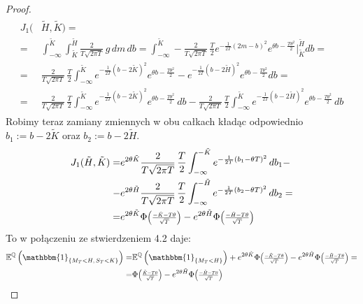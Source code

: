 \documentclass[11pt]{report}
\newcommand*{\Scale}[2][4]{\scalebox{#1}{$#2$}}%
\begin{document}
\begin{proof}
\begin{multline*}
\begin{split}
J_1(& \tilde{H}, \tilde{K}) = \\
= & \int_{-\infty}^{\tilde{K}} \int_{\tilde{K}}^{\tilde{H}} \frac{2}{T\sqrt{2\pi T}} \, g \, dm \, db =
\int_{-\infty}^{\tilde{K}} -\frac{2}{T\sqrt{2\pi T}} \, \frac{T}{2}e^{-\frac{1}{2T}(2m-b)^2}e^{\theta b-\frac{T\theta^2}{2}} |_{\tilde{K}}^{\tilde{H}} db = \\ = & \frac{2}{T\sqrt{2\pi T}} \, \frac{T}{2} \int_{-\infty}^{\tilde{K}} e^{-\frac{1}{2T}(b-2\tilde{K})^2}e^{\theta b-\frac{T\theta^2}{2}} -  e^{-\frac{1}{2T}(b-2\tilde{H})^2}e^{\theta b-\frac{T\theta^2}{2}}db = \\ = & \frac{2}{T\sqrt{2\pi T}} \, \frac{T}{2} \int_{-\infty}^{\tilde{K}} e^{-\frac{1}{2T}(b-2\tilde{K})^2}e^{\theta b-\frac{T\theta^2}{2}} \, db - \frac{2}{T\sqrt{2\pi T}} \, \frac{T}{2} \int_{-\infty}^{\tilde{K}} e^{-\frac{1}{2T}(b-2\tilde{H})^2}e^{\theta b-\frac{T\theta^2}{2}} \, db 
\end{split}
\end{multline*}
Robimy teraz zamiany zmiennych w obu całkach kładąc odpowiednio \\ $b_1:= b - 2\tilde{K}$ oraz $b_2:=b- 2\tilde{H}$.
\begin{multline*}
\begin{split}
J_1(\tilde{H}, \tilde{K}) = & e^{2 \theta \tilde{K}} \frac{2}{T\sqrt{2\pi T}} \, \frac{T}{2} \int_{-\infty}^{-\tilde{K}} e^{-\frac{1}{2T}(b_1-\theta T)^2} \, db_1 - \\ - & e^{2 \theta \tilde{H}} \frac{2}{T\sqrt{2\pi T}} \, \frac{T}{2} \int_{-\infty}^{-\tilde{H}} e^{-\frac{1}{2T}(b_2-\theta T)^2} \, db_2 = \\ = & e^{2 \theta \tilde{K}}  \Phi \Scale[0.8]{\left(\frac{-\tilde{K}-T\theta}{\sqrt{T}}\right)}  - e^{2 \theta \tilde{H}} \Phi \Scale[0.8]{\left(\frac{-\tilde{H}-T\theta}{\sqrt{T}}\right)}
\end{split}
\end{multline*}
To w połączeniu ze stwierdzeniem 4.2 daje:
\begin{multline*}
\begin{split}
\mathbb{E}^{\mathbb{Q}}\left(\mathbbm{1}_{ \{ M_T < H, \, S_T < K \} } \right) = & \mathbb{E}^{\mathbb{Q}}\left( \mathbbm{1}_{ \{ M_T<H \} } \right) +  e^{2 \theta \tilde{K}}  \Phi \Scale[0.8]{\left(\frac{-\tilde{K}-T\theta}{\sqrt{T}}\right)}  - e^{2 \theta \tilde{H}} \Phi \Scale[0.8]{\left(\frac{-\tilde{H}-T\theta}{\sqrt{T}}\right)} = \\ = & \Phi \Scale[0.8]{\left(\frac{\tilde{K}-T\theta}{\sqrt{T}}\right)} - e^{2 \theta \tilde{H}}\Phi \Scale[0.8]{\left(\frac{-\tilde{H}-T\theta}{\sqrt{T}}\right)}
\end{split}
\end{multline*}

\end{proof}
\end{document}
